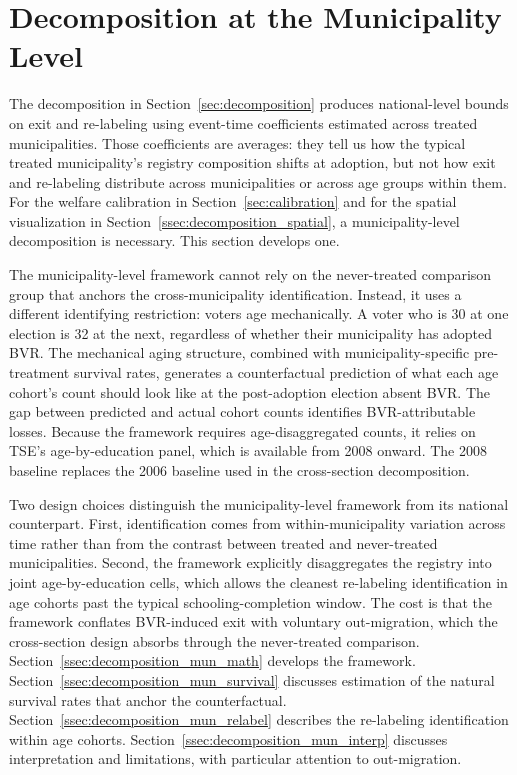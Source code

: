 \section{Decomposition at the Municipality Level}
\label{sec:decomposition_mun}

The decomposition in Section~\ref{sec:decomposition} produces national-level bounds on exit and re-labeling using event-time coefficients estimated across treated municipalities. Those coefficients are averages: they tell us how the typical treated municipality's registry composition shifts at adoption, but not how exit and re-labeling distribute across municipalities or across age groups within them. For the welfare calibration in Section~\ref{sec:calibration} and for the spatial visualization in Section~\ref{ssec:decomposition_spatial}, a municipality-level decomposition is necessary. This section develops one.

The municipality-level framework cannot rely on the never-treated comparison group that anchors the cross-municipality identification. Instead, it uses a different identifying restriction: voters age mechanically. A voter who is 30 at one election is 32 at the next, regardless of whether their municipality has adopted BVR. The mechanical aging structure, combined with municipality-specific pre-treatment survival rates, generates a counterfactual prediction of what each age cohort's count should look like at the post-adoption election absent BVR. The gap between predicted and actual cohort counts identifies BVR-attributable losses. Because the framework requires age-disaggregated counts, it relies on TSE's age-by-education panel, which is available from 2008 onward. The 2008 baseline replaces the 2006 baseline used in the cross-section decomposition.

Two design choices distinguish the municipality-level framework from its national counterpart. First, identification comes from within-municipality variation across time rather than from the contrast between treated and never-treated municipalities. Second, the framework explicitly disaggregates the registry into joint age-by-education cells, which allows the cleanest re-labeling identification in age cohorts past the typical schooling-completion window. The cost is that the framework conflates BVR-induced exit with voluntary out-migration, which the cross-section design absorbs through the never-treated comparison. Section~\ref{ssec:decomposition_mun_math} develops the framework. Section~\ref{ssec:decomposition_mun_survival} discusses estimation of the natural survival rates that anchor the counterfactual. Section~\ref{ssec:decomposition_mun_relabel} describes the re-labeling identification within age cohorts. Section~\ref{ssec:decomposition_mun_interp} discusses interpretation and limitations, with particular attention to out-migration.

